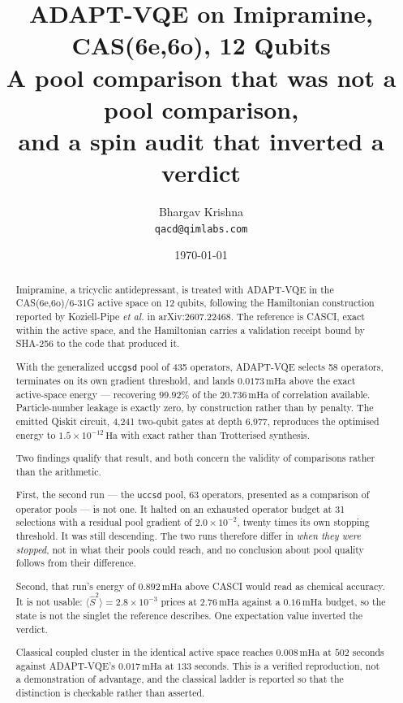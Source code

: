 \documentclass[11pt,a4paper]{article}
\title{\vspace{-1.1cm}\textbf{ADAPT-VQE on Imipramine,\\
CAS(6e,6o), 12 Qubits}\\[0.4em]
\large A pool comparison that was not a pool comparison,\\
and a spin audit that inverted a verdict}
\author{Bhargav Krishna\\\small\texttt{qacd@qimlabs.com}}
\date{\today}
\newcommand{\mHa}{\ensuremath{\,\mathrm{mHa}}}
\newcommand{\Ha}{\ensuremath{\,\mathrm{Ha}}}
\newcommand{\Ssq}{\ensuremath{\langle \hat{S}^2 \rangle}}
\newcommand{\code}[1]{\texttt{\small #1}}
\begin{document}
\maketitle
\thispagestyle{fancy}

\begin{abstract}
\noindent
Imipramine, a tricyclic antidepressant, is treated with ADAPT-VQE in the
CAS(6e,6o)/6-31G active space on 12 qubits, following the Hamiltonian
construction reported by Koziell-Pipe \emph{et al.} in arXiv:2607.22468. The
reference is CASCI, exact within the active space, and the Hamiltonian carries
a validation receipt bound by SHA-256 to the code that produced it.

With the generalized \code{uccgsd} pool of 435 operators, ADAPT-VQE selects 58
operators, terminates on its own gradient threshold, and lands $0.0173\mHa$
above the exact active-space energy --- recovering $99.92\%$ of the
$20.736\mHa$ of correlation available. Particle-number leakage is exactly zero,
by construction rather than by penalty. The emitted Qiskit circuit, 4{,}241
two-qubit gates at depth 6{,}977, reproduces the optimised energy to
$1.5\times10^{-12}\Ha$ with exact rather than Trotterised synthesis.

Two findings qualify that result, and both concern the validity of comparisons
rather than the arithmetic.

First, the second run --- the \code{uccsd} pool, 63 operators, presented as a
comparison of operator pools --- is not one. It halted on an exhausted operator
budget at 31 selections with a residual pool gradient of $2.0\times10^{-2}$,
twenty times its own stopping threshold. It was still descending. The two runs
therefore differ in \emph{when they were stopped}, not in what their pools could
reach, and no conclusion about pool quality follows from their difference.

Second, that run's energy of $0.892\mHa$ above CASCI would read as chemical
accuracy. It is not usable: $\Ssq = 2.8\times10^{-3}$ prices at $2.76\mHa$
against a $0.16\mHa$ budget, so the state is not the singlet the reference
describes. One expectation value inverted the verdict.

Classical coupled cluster in the identical active space reaches $0.008\mHa$ at
$502$ seconds against ADAPT-VQE's $0.017\mHa$ at $133$ seconds. This is a
verified reproduction, not a demonstration of advantage, and the classical
ladder is reported so that the distinction is checkable rather than asserted.
\end{abstract}
\end{document}
